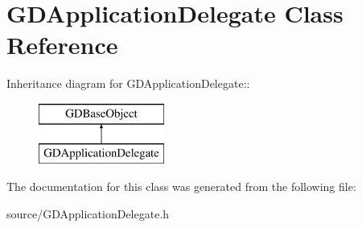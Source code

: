 \hypertarget{interface_g_d_application_delegate}{
\section{GDApplicationDelegate Class Reference}
\label{interface_g_d_application_delegate}
}
Inheritance diagram for GDApplicationDelegate::\begin{figure}[H]
\begin{center}
\leavevmode
\includegraphics[height=2cm]{interface_g_d_application_delegate}
\end{center}
\end{figure}


The documentation for this class was generated from the following file:\begin{DoxyCompactItemize}
\item 
source/GDApplicationDelegate.h\end{DoxyCompactItemize}

